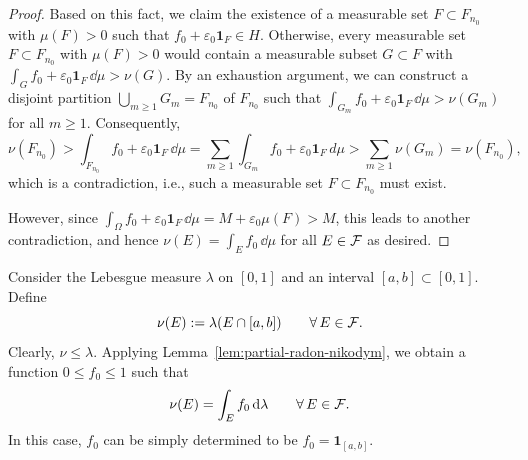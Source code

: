 \begin{proof}
	Based on this fact, we claim the existence of a measurable set $F\subset F_{n_0}$ with $\mu(F)>0$ such that $f_0 + \varepsilon_0\mathbf{1}_F\in H$. Otherwise, every measurable set $F\subset F_{n_0}$ with $\mu(F)>0$ would contain a measurable subset $G\subset F$ with $\int_G f_0 + \varepsilon_0 \mathbf{1}_F\,\dd\mu > \nu(G)$. By an exhaustion argument, we can construct a disjoint partition $\bigcup_{m\ge 1} G_m = F_{n_0}$ of $F_{n_0}$ such that $\int_{G_m} f_0 + \varepsilon_0 \mathbf{1}_F\,\dd\mu > \nu(G_m)$ for all $m\ge 1$. Consequently,
\[
	\nu(F_{n_0}) > \int_{F_{n_0}}f_0 + \varepsilon_0\mathbf{1}_{F}\, \dd\mu = \sum_{m\ge 1} \int_{G_m} f_0 + \varepsilon_0 \mathbf{1}_F\,d\mu > \sum_{m\ge 1} \nu(G_m) = \nu(F_{n_0}),
\]
which is a contradiction, i.e., such a measurable set $F\subset F_{n_0}$ must exist. 

However, since $\int_\Omega f_0 + \varepsilon_0\mathbf{1}_F\,\dd\mu = M + \varepsilon_0\mu(F) > M$, this leads to another contradiction, and hence $\nu(E)=\int_E f_0\,\dd\mu$ for all $E\in\mathcal F$ as desired.
\end{proof}

\begin{example}
	Consider the Lebesgue measure $\lambda$ on $[0,1]$ and an interval $[a,b]\subset[0,1]$. Define
	\[
		\nu(E) := \lambda(E\cap [a,b])\qquad\forall\,E\in\mathcal F.
	\]
	Clearly, $\nu\le \lambda$. Applying Lemma~\ref{lem:partial-radon-nikodym}, we obtain a function $0\le f_0\le 1$ such that
	\[
		\nu(E) = \int_E f_0\,\mathrm{d}\lambda\qquad\forall\,E\in\mathcal F.
	\]
	In this case, $f_0$ can be simply determined to be $f_0 = \mathbf{1}_{[a,b]}$.
\end{example}

